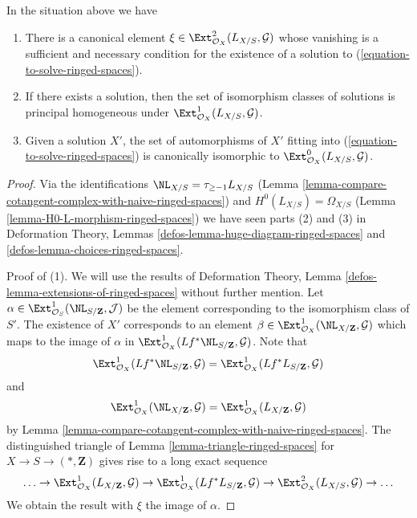 \begin{lemma}
\label{lemma-find-obstruction-ringed-spaces}
In the situation above we have
\begin{enumerate}
\item There is a canonical element
$\xi \in \Ext^2_{\mathcal{O}_X}(L_{X/S}, \mathcal{G})$
whose vanishing is a sufficient and necessary condition for the existence
of a solution to (\ref{equation-to-solve-ringed-spaces}).
\item If there exists a solution, then the set of
isomorphism classes of solutions is principal homogeneous under
$\Ext^1_{\mathcal{O}_X}(L_{X/S}, \mathcal{G})$.
\item Given a solution $X'$, the set of automorphisms of $X'$
fitting into (\ref{equation-to-solve-ringed-spaces}) is canonically isomorphic
to $\Ext^0_{\mathcal{O}_X}(L_{X/S}, \mathcal{G})$.
\end{enumerate}
\end{lemma}

\begin{proof}
Via the identifications $\NL_{X/S} = \tau_{\geq -1}L_{X/S}$
(Lemma \ref{lemma-compare-cotangent-complex-with-naive-ringed-spaces})
and
$H^0(L_{X/S}) = \Omega_{X/S}$
(Lemma \ref{lemma-H0-L-morphism-ringed-spaces})
we have seen parts (2) and (3) in
Deformation Theory, Lemmas \ref{defos-lemma-huge-diagram-ringed-spaces} and
\ref{defos-lemma-choices-ringed-spaces}.

\medskip\noindent
Proof of (1). We will use the results of
Deformation Theory, Lemma \ref{defos-lemma-extensions-of-ringed-spaces}
without further mention.
Let $\alpha \in \Ext^1_{\mathcal{O}_S}(\NL_{S/\mathbf{Z}}, \mathcal{J})$
be the element corresponding to the isomorphism class of $S'$.
The existence of $X'$ corresponds to an element
$\beta \in \Ext_{\mathcal{O}_X}^1(\NL_{X/\mathbf{Z}}, \mathcal{G})$
which maps to the image of $\alpha$ in
$\Ext^1_{\mathcal{O}_X}(Lf^*\NL_{S/\mathbf{Z}}, \mathcal{G})$.
Note that
$$
\Ext^1_{\mathcal{O}_X}(Lf^*\NL_{S/\mathbf{Z}}, \mathcal{G}) =
\Ext^1_{\mathcal{O}_X}(Lf^*L_{S/\mathbf{Z}}, \mathcal{G})
$$
and
$$
\Ext^1_{\mathcal{O}_X}(\NL_{X/\mathbf{Z}}, \mathcal{G}) =
\Ext^1_{\mathcal{O}_X}(L_{X/\mathbf{Z}}, \mathcal{G})
$$
by Lemma \ref{lemma-compare-cotangent-complex-with-naive-ringed-spaces}.
The distinguished triangle of Lemma \ref{lemma-triangle-ringed-spaces}
for $X \to S \to (*, \mathbf{Z})$ gives rise to a long exact sequence
$$
\ldots \to
\Ext^1_{\mathcal{O}_X}(L_{X/\mathbf{Z}}, \mathcal{G}) \to
\Ext^1_{\mathcal{O}_X}(Lf^*L_{S/\mathbf{Z}}, \mathcal{G}) \to
\Ext^2_{\mathcal{O}_X}(L_{X/S}, \mathcal{G}) \to \ldots
$$
We obtain the result with $\xi$ the image of $\alpha$.
\end{proof}










